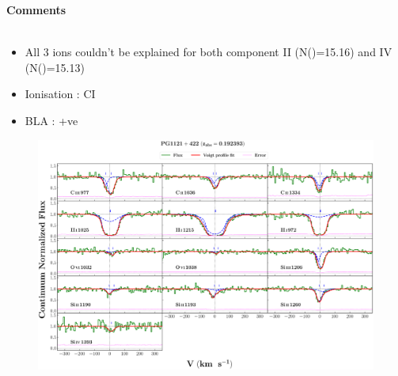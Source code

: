 \documentclass[12pt]{report}
\newcommand\ion[2]{\text{#1\,\textsc{\lowercase{#2}}}}
\begin{document}
\newpage

\textbf{Comments}
\\\\
\begin{itemize}
    \item All 3 ions couldn't be explained for both component II (N(\ion{H}{i})=15.16) and IV (N(\ion{H}{i})=15.13)
    \item Ionisation : CI
    \item BLA : +ve
\end{itemize}



\newpage

\begin{landscape}

\begin{figure}
    \centering
    \vspace{-20mm}
    \hspace*{-35mm}
    \includegraphics[width=1.25\linewidth]{System-Plots/PG1121+422_z=0.192393_sys_plot.png}
\end{figure}

\end{landscape}
\end{document}
